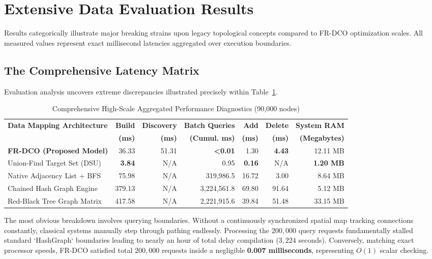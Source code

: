 \documentclass[runningheads]{llncs}
\begin{document}
\section{Extensive Data Evaluation Results}

Results categorically illustrate major breaking strains upon legacy topological concepts compared to FR-DCO optimization scales. All measured values represent exact millisecond latencies aggregated over execution boundaries.

\subsection{The Comprehensive Latency Matrix}

Evaluation analysis uncovers extreme discrepancies illustrated precisely within Table~\ref{tab_results}. 

\begin{table}[htbp]
\caption{Comprehensive High-Scale Aggregated Performance Diagnostics (90,000 nodes)}
\label{tab_results}
\centering
\begin{tabular}{lrrrrrr}
\toprule
\textbf{Data Mapping Architecture} & \textbf{Build} & \textbf{Discovery} & \textbf{Batch Queries} & \textbf{Add} & \textbf{Delete} & \textbf{System RAM} \\
 & \textbf{(ms)} & \textbf{(ms)} & \textbf{(Cumul. ms)} & \textbf{(ms)} & \textbf{(ms)} & \textbf{(Megabytes)} \\
\midrule
\textbf{FR-DCO (Proposed Model)} & 36.33 & 51.31 & {\textbf{<0.01}} & 1.30 & \textbf{4.43} & 12.11 MB \\
Union-Find Target Set (DSU) & \textbf{3.84} & N/A & 0.95 & \textbf{0.16} & N/A & \textbf{1.20 MB} \\
Native Adjacency List + BFS & 75.98 & N/A & 319,986.5 & 16.72 & 3.00 & 8.64 MB \\
Chained Hash Graph Engine & 379.13 & N/A & 3,224,561.8 & 69.80 & 91.64 & 5.12 MB \\
Red-Black Tree Graph Matrix & 417.58 & N/A & 2,221,915.6 & 39.84 & 51.48 & 33.15 MB \\
\bottomrule
\end{tabular}
\end{table}

The most obvious breakdown involves querying boundaries. Without a continuously synchronized spatial map tracking connections constantly, classical systems manually step through pathing endlessly. Processing the $200,000$ query requests fundamentally stalled standard `HashGraph` boundaries leading to nearly an hour of total delay compilation ($3,224$ seconds). Conversely, matching exact processor speeds, FR-DCO satisfied total $200,000$ requests inside a negligible \textbf{0.007 milliseconds}, representing $O(1)$ scalar checking. 
\end{document}
